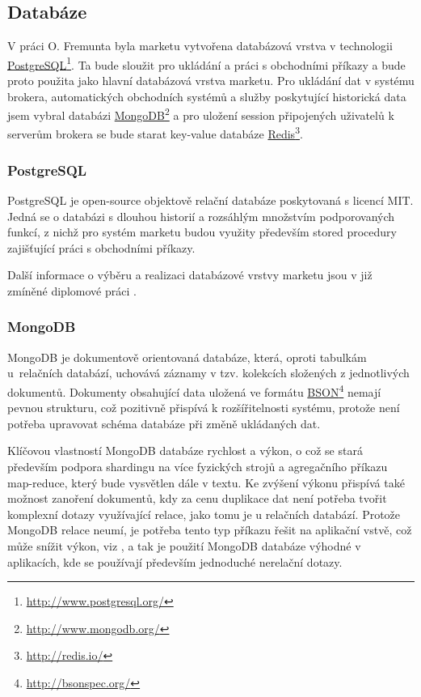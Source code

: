 \documentclass[thesis=M,czech]{FITthesis}[2012/06/26]
\newcommand\fnurl[2]{\href{#2}{#1}\footnote{\url{#2}}}
\begin{document}
\subsection{Databáze}
	
	V práci O. Fremunta \cite{Fremunt2014} byla marketu vytvořena databázová vrstva v technologii \fnurl{PostgreSQL}{http://www.postgresql.org/}. Ta bude sloužit pro ukládání a práci s obchodními příkazy a bude proto použita jako hlavní databázová vrstva marketu.
	Pro ukládání dat v systému brokera, automatických obchodních systémů a služby poskytující historická data jsem vybral databázi \fnurl{MongoDB}{http://www.mongodb.org/} a pro uložení session připojených uživatelů k serverům brokera se bude starat key-value databáze \fnurl{Redis}{http://redis.io/}.
	
	
\subsubsection{PostgreSQL}

	PostgreSQL je open-source objektově relační databáze\cite{ORDBMS} poskytovaná s licencí MIT. Jedná se o databázi s dlouhou historií a rozsáhlým množstvím podporovaných funkcí, z nichž pro systém marketu budou využity především stored procedury zajišťující práci s obchodními příkazy.
		
	Další informace o výběru a realizaci databázové vrstvy marketu jsou v již zmíněné diplomové práci \cite{Fremunt2014}.

\subsubsection{MongoDB}
\label{sec:mongo}

	MongoDB je dokumentově orientovaná databáze, která, oproti tabulkám u~relačních databází, uchovává záznamy v tzv. kolekcích složených z jednotlivých dokumentů. Dokumenty obsahující data uložená ve formátu \fnurl{BSON}{http://bsonspec.org/} nemají pevnou strukturu, což pozitivně přispívá k rozšířitelnosti systému, protože není potřeba upravovat schéma databáze při změně ukládaných dat.
	
	Klíčovou vlastností MongoDB databáze rychlost a výkon, o což se stará především podpora shardingu na více fyzických strojů a agregačního příkazu map-reduce, který bude vysvětlen dále v textu. Ke zvýšení výkonu přispívá také možnost zanoření dokumentů, kdy za cenu duplikace dat není potřeba tvořit komplexní dotazy využívající relace, jako tomu je u relačních databází. Protože MongoDB relace neumí, je potřeba tento typ příkazu řešit na aplikační vstvě, což může snížit výkon, viz \cite{RBDMSVsNoSQL}, a tak je použití MongoDB databáze výhodné v aplikacích, kde se používají především jednoduché nerelační dotazy.
	
\end{document}
